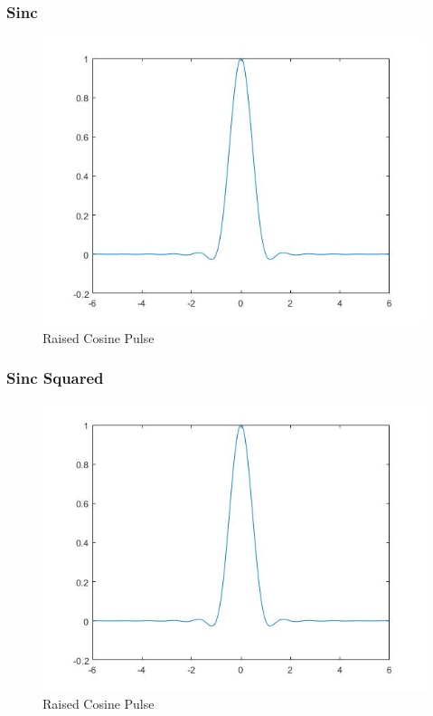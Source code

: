 \documentclass{article}
\begin{document}
\subsubsection{Sinc}
\begin{figure}[H]
  \begin{center}
    \includegraphics[width = \linewidth]{Raised_Cosine_Pulse.jpg}
    \caption{Raised Cosine Pulse}
    \label{fig:Raised_Cosine_Pulse}
  \end{center}
\end{figure}
\subsubsection{Sinc Squared}
\begin{figure}[H]
  \begin{center}
    \includegraphics[width = \linewidth]{Raised_Cosine_Pulse.jpg}
    \caption{Raised Cosine Pulse}
    \label{fig:Raised_Cosine_Pulse}
  \end{center}
\end{figure}
\end{document}
